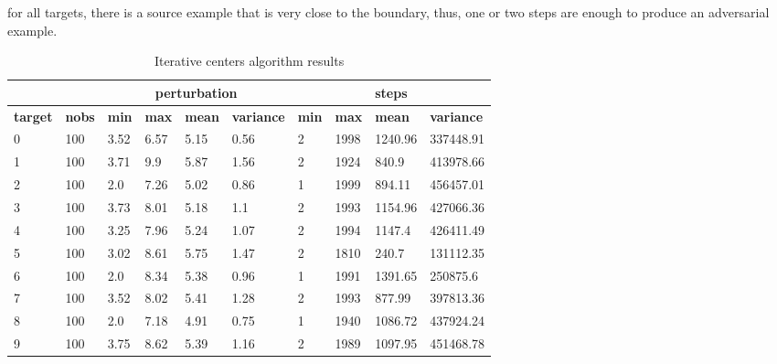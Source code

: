\documentclass{article}
\begin{document}
for all targets, there is a source example that is very close to the boundary, thus, one or two steps are enough to produce an adversarial example.


\begin{table}[]
\caption{Iterative centers algorithm results}
\label{tab:iterative_result}
\begin{tabular}{|l|l|l|l|l|l|l|l|l|l|}
\hline
\textbf{}       & \textbf{}     & \multicolumn{4}{c|}{\textbf{perturbation}}                      & \multicolumn{4}{c|}{\textbf{steps}}                             \\ \hline
\textbf{target} & \textbf{nobs} & \textbf{min} & \textbf{max} & \textbf{mean} & \textbf{variance} & \textbf{min} & \textbf{max} & \textbf{mean} & \textbf{variance} \\ \hline
0 & 100  & 3.52     & 6.57     & 5.15      & 0.56          & 2         & 1998      & 1240.96    & 337448.91      \\ \hline
1 & 100  & 3.71     & 9.9      & 5.87      & 1.56          & 2         & 1924      & 840.9      & 413978.66      \\ \hline
2 & 100  & 2.0      & 7.26     & 5.02      & 0.86          & 1         & 1999      & 894.11     & 456457.01      \\ \hline
3 & 100  & 3.73     & 8.01     & 5.18      & 1.1           & 2         & 1993      & 1154.96    & 427066.36      \\ \hline
4 & 100  & 3.25     & 7.96     & 5.24      & 1.07          & 2         & 1994      & 1147.4     & 426411.49      \\ \hline
5 & 100  & 3.02     & 8.61     & 5.75      & 1.47          & 2         & 1810      & 240.7      & 131112.35      \\ \hline
6 & 100  & 2.0      & 8.34     & 5.38      & 0.96          & 1         & 1991      & 1391.65    & 250875.6       \\ \hline
7 & 100  & 3.52     & 8.02     & 5.41      & 1.28          & 2         & 1993      & 877.99     & 397813.36      \\ \hline
8 & 100  & 2.0      & 7.18     & 4.91      & 0.75          & 1         & 1940      & 1086.72    & 437924.24      \\ \hline
9 & 100  & 3.75     & 8.62     & 5.39      & 1.16          & 2         & 1989      & 1097.95    & 451468.78      \\ \hline
\end{tabular}
\end{table}
\end{document}
